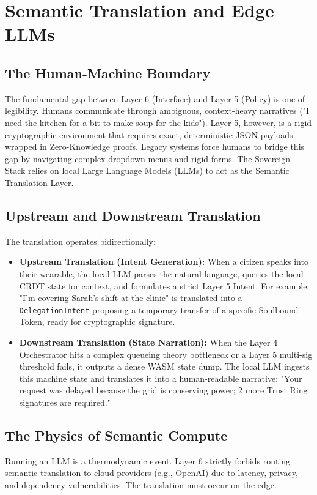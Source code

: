 \chapter{Semantic Translation and Edge LLMs}

\section{The Human-Machine Boundary}
The fundamental gap between Layer 6 (Interface) and Layer 5 (Policy) is one of legibility. Humans communicate through ambiguous, context-heavy narratives ("I need the kitchen for a bit to make soup for the kids"). Layer 5, however, is a rigid cryptographic environment that requires exact, deterministic JSON payloads wrapped in Zero-Knowledge proofs. Legacy systems force humans to bridge this gap by navigating complex dropdown menus and rigid forms. The Sovereign Stack relies on local Large Language Models (LLMs) to act as the Semantic Translation Layer.

\section{Upstream and Downstream Translation}
The translation operates bidirectionally:
\begin{itemize}
    \item \textbf{Upstream Translation (Intent Generation):} When a citizen speaks into their wearable, the local LLM parses the natural language, queries the local CRDT state for context, and formulates a strict Layer 5 Intent. For example, "I'm covering Sarah's shift at the clinic" is translated into a \texttt{DelegationIntent} proposing a temporary transfer of a specific Soulbound Token, ready for cryptographic signature.
    \item \textbf{Downstream Translation (State Narration):} When the Layer 4 Orchestrator hits a complex queueing theory bottleneck or a Layer 5 multi-sig threshold fails, it outputs a dense WASM state dump. The local LLM ingests this machine state and translates it into a human-readable narrative: "Your request was delayed because the grid is conserving power; 2 more Trust Ring signatures are required."
\end{itemize}

\section{The Physics of Semantic Compute}
Running an LLM is a thermodynamic event. Layer 6 strictly forbids routing semantic translation to cloud providers (e.g., OpenAI) due to latency, privacy, and dependency vulnerabilities. The translation must occur on the edge.

